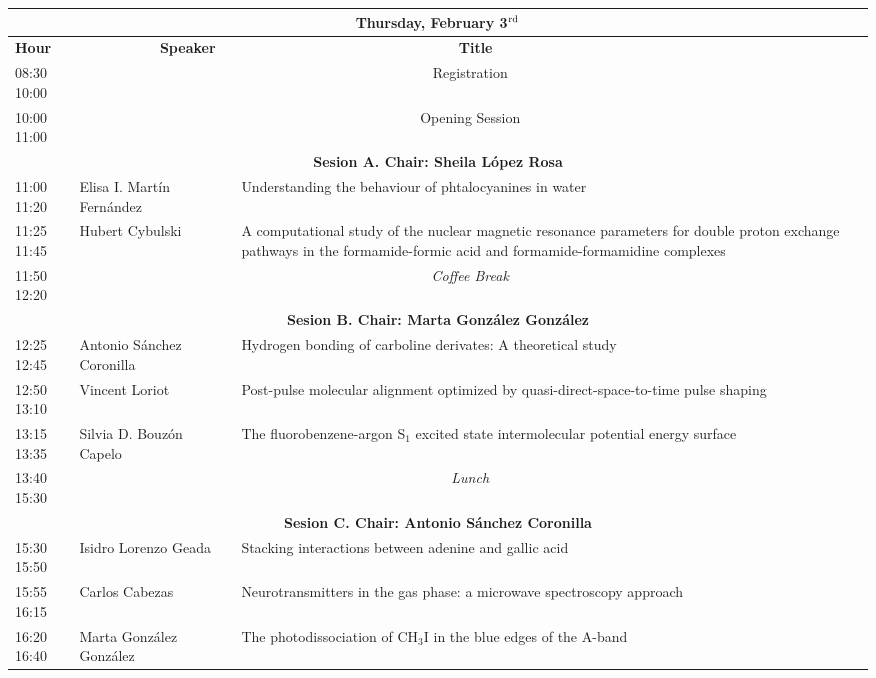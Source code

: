 \begin{flushleft}
\begin{tabular}{|m{1.0cm}|m{4.8cm}|m{10.2cm}|}
\multicolumn{3}{c}{\textbf{Thursday, February 3$^{\rm rd}$}} \\ 
\hline
\cellcolor[gray]{0.7} {\bf Hour} & \cellcolor[gray]{0.7} {\bf ~~~~~~~~~~Speaker} &\cellcolor[gray]{0.7} {\bf ~~~~~~~~~~~~~~~~~~~~~~~~~~~Title}\\
\hline
 08:30 10:00 & \multicolumn{2}{c|}{Registration}\\ 
\hline
 10:00 11:00 & \multicolumn{2}{c|}{Opening Session} \\ 
\hline
\multicolumn{3}{c}{\cellcolor[gray]{0.7}  \bf  Sesion A. Chair: Sheila L\'opez Rosa} \\
\hline
 11:00 11:20 & Elisa I. Mart\'in Fern\'andez & Understanding the behaviour of phtalocyanines in water \\ 
\hline
11:25 11:45 & Hubert Cybulski & A computational study of the nuclear magnetic resonance parameters for double proton exchange pathways in the formamide-formic acid and formamide-formamidine complexes \\ 
\hline
11:50 12:20 & \multicolumn{2}{c|}{\it Coffee Break} \\ 
\hline
\multicolumn{3}{c}{ \cellcolor[gray]{0.7}  \bf Sesion B. Chair: Marta Gonz\'alez Gonz\'alez } \\
\hline
 12:25 12:45 & Antonio S\'anchez Coronilla & Hydrogen bonding of carboline derivates: A theoretical study \\ 
\hline
12:50 13:10 & Vincent Loriot & Post-pulse molecular alignment optimized by quasi-direct-space-to-time pulse shaping \\ 
\hline
13:15 13:35 & Silvia D. Bouz\'on Capelo & The fluorobenzene-argon S$_1$ excited state intermolecular potential energy surface \\ 
\hline
13:40 15:30 & \multicolumn{2}{c|}{\it Lunch} \\ 
\hline
\multicolumn{3}{c}{ \cellcolor[gray]{0.7}  \bf Sesion C. Chair: Antonio S\'anchez Coronilla } \\
\hline
15:30 15:50 & Isidro Lorenzo Geada & Stacking interactions between adenine and gallic acid \\ 
\hline
15:55 16:15 & Carlos Cabezas & Neurotransmitters in the gas phase: a microwave spectroscopy approach \\ 
\hline
16:20 16:40 & Marta Gonz\'alez Gonz\'alez & The photodissociation of CH$_3$I in the blue edges of the A-band \\ 

\end{tabular}
\end{flushleft}
